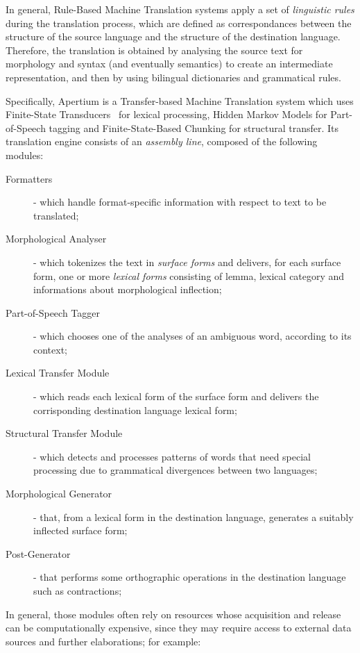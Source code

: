 \documentclass[11pt]{article}
\begin{document}
In general, Rule-Based Machine Translation systems apply a set of \emph{linguistic rules} during the translation process, which are defined as correspondances between the structure of the source language and the structure of the destination language. Therefore, the translation is obtained by analysing the source text for morphology and syntax (and eventually semantics) to create an intermediate representation, and then by using bilingual dictionaries and grammatical rules.

Specifically, Apertium is a Transfer-based Machine Translation system which uses Finite-State Transducers~\citep{fst} for lexical processing, Hidden Markov Models for Part-of-Speech tagging and Finite-State-Based Chunking for structural transfer. Its translation engine consists of an \emph{assembly line}, composed of the following modules:

\begin{description}
 \item[Formatters] - which handle format-specific information with respect to text to be translated;
 \item[Morphological Analyser] - which tokenizes the text in \emph{surface forms} and delivers, for each surface form, one or more \emph{lexical forms} consisting of lemma, lexical category and informations about morphological inflection;
 \item[Part-of-Speech Tagger] - which chooses one of the analyses of an ambiguous word, according to its context;
 \item[Lexical Transfer Module] - which reads each lexical form of the surface form and delivers the corrisponding destination language lexical form;
 \item[Structural Transfer Module] - which detects and processes patterns of words that need special processing due to grammatical divergences between two languages;
 \item[Morphological Generator] - that, from a lexical form in the destination language, generates a suitably inflected surface form;
 \item[Post-Generator] - that performs some orthographic operations in the destination language such as contractions;
\end{description}

In general, those modules often rely on resources whose acquisition and release can be computationally expensive, since they may require access to external data sources and further elaborations; for example:
\end{document}
